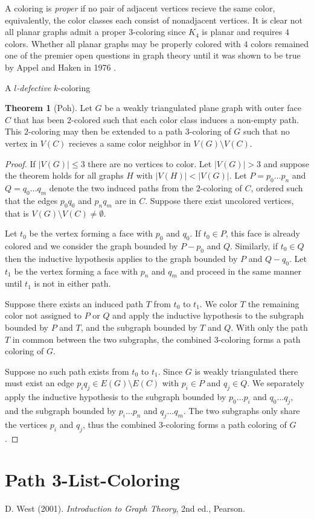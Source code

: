 \documentclass[letterpaper, 12pt]{amsart}
\theoremstyle{definition}
\theoremstyle{definition}
\theoremstyle{thm}
\newtheorem{theorem}{Theorem}[section]
\theoremstyle{definition}
\begin{document}
A coloring is \textit{proper} if no pair of adjacent vertices recieve the same
color, equivalently, the color classes each consist of nonadjacent vertices. It
is clear not all planar graphs admit a proper $3$-coloring since $K_4$ is planar
and requires $4$ colors. Whether all planar graphs may be properly colored with
$4$ colors remained one of the premier open questions in graph theory until it
was shown to be true by Appel and Haken in 1976 \cite{appelhaken1, appelhaken2}.

A \textit{$l$-defective} $k$-coloring

\begin{theorem}[Poh]
Let $G$ be a weakly triangulated plane graph with outer face $C$ that has
been $2$-colored such that each color class induces a non-empty path. This
$2$-coloring may then be extended to a path $3$-coloring of $G$ such that no
vertex in $V(C)$ recieves a same color neighbor in $V(G)\setminus V(C)$.
\end{theorem}

\begin{proof}
If $|V(G)|\le 3$ there are no vertices to color. Let $|V(G)|>3$ and
suppose the theorem holds for all graphs $H$ with $|V(H)|<|V(G)|$. Let
$P=p_0\ldots p_n$ and $Q=q_0\ldots q_m$ denote the two induced paths from the
$2$-coloring of $C$, ordered such that the edges $p_0q_0$ and $p_nq_m$ are in
$C$. Suppose there exist uncolored vertices, that is $V(G)\setminus V(C)\ne
\emptyset$.

Let $t_0$ be the vertex forming a face with $p_0$ and $q_0$. If
$t_0\in P$, this face is already colored and we consider the graph bounded by
$P-p_0$ and $Q$. Similarly, if $t_0\in Q$ then the inductive hypothesis applies
to the graph bounded by $P$ and $Q-q_0$. Let $t_1$ be the vertex forming a face
with $p_n$ and $q_m$ and proceed in the same manner until $t_1$ is not in either
path.

Suppose there exists an induced path $T$ from $t_0$ to $t_1$. We color
$T$ the remaining color not assigned to $P$ or $Q$ and apply the inductive
hypothesis to the subgraph bounded by $P$ and $T$, and the subgraph bounded by
$T$ and $Q$. With only the path $T$ in common between the two subgraphs, the
combined $3$-coloring forms a path coloring of $G$.

Suppose no such path exists from $t_0$ to $t_1$. Since $G$ is weakly
triangulated there must exist an edge $p_iq_j\in E(G)\setminus E(C)$ with
$p_i\in P$ and $q_j\in Q$. We separately apply the inductive hypothesis to the
subgraph bounded by $p_0\ldots p_i$ and $q_0\ldots q_j$, and the subgraph
bounded by $p_i\ldots p_n$ and $q_j\ldots q_m$. The two subgraphs only share the
vertices $p_i$ and $q_j$, thus the combined $3$-coloring forms a path coloring
of $G$.
\end{proof}

\section{Path 3-List-Coloring}


\begin{thebibliography}{2}  %
	D. West (2001).
	\textit{Introduction to Graph Theory},
	2nd ed., Pearson.
\end{thebibliography}
\end{document}
